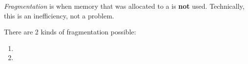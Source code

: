 \begin{definition}[Fragmentation]\label{def:Fragmentation}
  \emph{Fragmentation} is when memory that was allocated to a  is \textbf{not} used.
  Technically, this is an inefficiency, not a problem.

  There are 2 kinds of fragmentation possible:
  \begin{enumerate}[noitemsep]
  \item {}
  \item {}
  \end{enumerate}
\end{definition}


